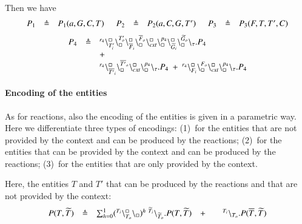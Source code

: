 Then we have 
\[
\begin{array}{lcl @{\hspace{0.5cm}}lcl @{\hspace{0.5cm}}lcl }
P_1 & \defeq & P_1(a,G,C,T) &   P_2 & \defeq & P_2(a,C,G,T') &   P_3 & \defeq & P_3(F,T,T',C)  \\
\end{array}
\]
\[
\begin{array}{lcl}
P_4 & \triangleq &{}^{r_4}\backslash_{T'_i}^{\scriptstyle {\square}}\backslash_{\scriptstyle {\square}}^{T'_o}
                                                     \backslash_{\overline{F}_i}^{\scriptstyle {\square}}\backslash_{\scriptstyle {\square}}^{\overline{F}_o}
					        \backslash_{\mathit{cxt}}^{\scriptstyle {\square}}\backslash_{\scriptstyle {\square}}^{p_4}
					        \backslash_{\widetilde{G}_i}^{\scriptstyle {\square}}\backslash_{\scriptstyle {\square}}^{\widetilde{G}_o}
			\backslash_{\tau}.P_4  \\
				&& +\\
&&{}^{r_4}\backslash_{\overline{T'}_i}^{\scriptstyle {\square}}\backslash_{\scriptstyle {\square}}^{\overline{T'}_o}\backslash_{cxt}^{\scriptstyle {\square}}\backslash_{\scriptstyle {\square}}^{p_4} \backslash_{\tau}.P_4 \ +\  {}^{r_4}\backslash_{F_i}^{\scriptstyle {\square}}\backslash_{\scriptstyle {\square}}^{F_o}\backslash_{\mathit{cxt}}^{\scriptstyle {\square}}\backslash_{\scriptstyle {\square}}^{p_4} \backslash_{\tau}.P_4
\end{array}
\]
\noindent

\paragraph{Encoding of the entities}

As for reactions, also the encoding of the entities is given in a parametric way.
Here we differentiate three types of encodings: (1)~for the entities that are not  provided by the context and  can be produced by the reactions; (2)~for the entities that can be provided by the context and can be  produced by the reactions; (3)~for the entities that are only provided by the context.

Here, the entities $T$ and $T'$ that can be produced by the reactions and that are not provided by the context:
\[
\begin{array}{lcllcl}
P (T,\widetilde{T})&\triangleq & \sum_{h=0}^1 ({}^{T_i}\backslash_{T_o}^{\scriptstyle {\square}}\backslash_{\scriptstyle {\square}})^h\ {}^{\widetilde{T}_i} \backslash_{\widetilde{T}_o}.P (T,\widetilde{T})
& +  && {}^{T_i} \backslash_{T_o}.P (\overline{T},\widetilde{T}) \\
\end{array}
\]

